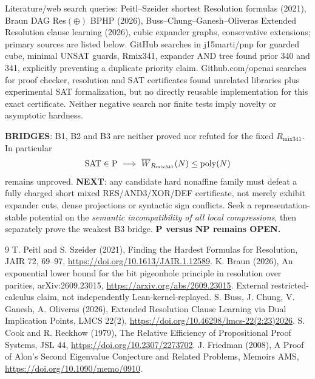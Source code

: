 \documentclass[11pt]{article}
\begin{document}
\noindent Literature/web search queries: Peitl--Szeider shortest Resolution formulas (2021), Braun DAG Res$(\oplus)$ BPHP (2026), Buss--Chung--Ganesh--Oliveras Extended Resolution clause learning (2026), cubic expander graphs, conservative extensions; primary sources are listed below. GitHub searches in j15marti/pnp for guarded cube, minimal UNSAT guards, Rmix341, expander AND tree found prior 340 and 341, explicitly preventing a duplicate priority claim. Github.com/openai searches for proof checker, resolution and SAT certificates found unrelated libraries plus experimental SAT formalization, but no directly reusable implementation for this exact certificate. Neither negative search nor finite tests imply novelty or asymptotic hardness.

\noindent \textbf{BRIDGES}: B1, B2 and B3 are neither proved nor refuted for the fixed $R_{\mathrm{mix341}}$. In particular
\[
 {\rm SAT}\in{\rm P}\ \Longrightarrow\
 \overline W_{R_{\mathrm{mix341}}}(N)\le {\rm poly}(N)
\]
remains unproved. \textbf{NEXT}: any candidate hard nonaffine family must defeat a fully charged short mixed RES/AND3/XOR/DEF certificate, not merely exhibit expander cuts, dense projections or syntactic sign conflicts. Seek a representation-stable potential on the \emph{semantic incompatibility of all local compressions}, then separately prove the weakest B3 bridge. \textbf{P versus NP remains OPEN.}

\begin{thebibliography}{9}
 T. Peitl and S. Szeider (2021), Finding the Hardest Formulas for Resolution, JAIR 72, 69--97, \url{https://doi.org/10.1613/JAIR.1.12589}.
\bibitem{braun} K. Braun (2026), An exponential lower bound for the bit pigeonhole principle in resolution over parities, arXiv:2609.23015, \url{https://arxiv.org/abs/2609.23015}. External restricted-calculus claim, not independently Lean-kernel-replayed.
\bibitem{ercl} S. Buss, J. Chung, V. Ganesh, A. Oliveras (2026), Extended Resolution Clause Learning via Dual Implication Points, LMCS 22(2), \url{https://doi.org/10.46298/lmcs-22(2:23)2026}.
\bibitem{cook} S. Cook and R. Reckhow (1979), The Relative Efficiency of Propositional Proof Systems, JSL 44, \url{https://doi.org/10.2307/2273702}.
\bibitem{friedman} J. Friedman (2008), A Proof of Alon's Second Eigenvalue Conjecture and Related Problems, Memoirs AMS, \url{https://doi.org/10.1090/memo/0910}.
\end{thebibliography}
\end{document}
